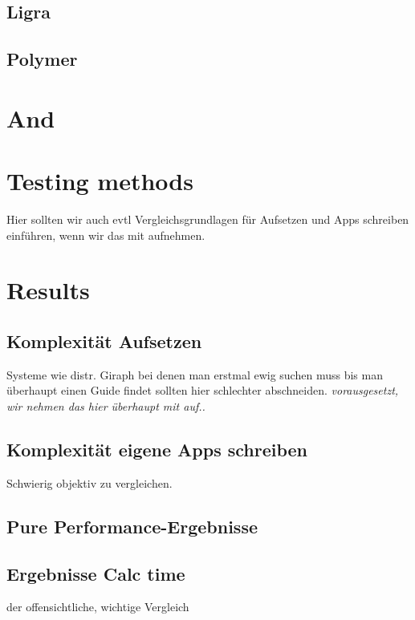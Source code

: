 \documentclass[conference,a4paper]{IEEEtran}
\begin{document}
\subsection{Ligra}


\subsection{Polymer}



\section{And}

\section{Testing methods}


Hier sollten wir auch evtl Vergleichsgrundlagen für Aufsetzen und Apps schreiben einführen, wenn wir das mit aufnehmen.


\section{Results}
\subsection{Komplexität Aufsetzen}
Systeme wie distr. Giraph bei denen man erstmal ewig suchen muss bis man überhaupt einen Guide findet sollten hier schlechter abschneiden. \emph{vorausgesetzt, wir nehmen das hier überhaupt mit auf..}

\subsection{Komplexität eigene Apps schreiben}
Schwierig objektiv zu vergleichen.


\subsection{Pure Performance-Ergebnisse}

\subsection{Ergebnisse Calc time}
der offensichtliche, wichtige Vergleich
\end{document}
